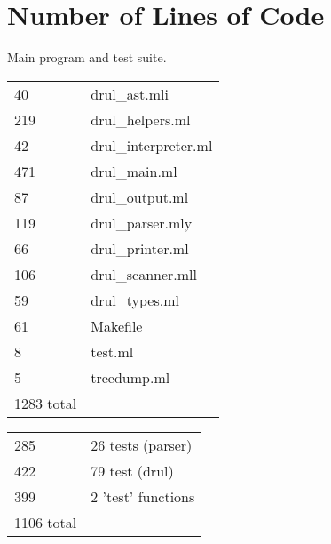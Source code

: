 


\chapter{Number of Lines of Code}

Main program and test suite.\\

\begin{table}[h]
\begin{small}
\begin{center}
\begin{tabular}{|l|l|} \hline
40	& drul\_ast.mli	\\
219	& drul\_helpers.ml\\	
42	& drul\_interpreter.ml\\
471	& drul\_main.ml\\
87	& drul\_output.ml	\\
119	& drul\_parser.mly\\ \hline
66	& drul\_printer.ml\\
106	& drul\_scanner.mll\\	
59	& drul\_types.ml\\
61	& Makefile\\
8	& test.ml	\\
5	& treedump.ml \\	\hline
 1283 total	& \\\hline
\end{tabular}
\end{center}
\end{small}
\end{table}


\begin{table}[h]
\begin{small}
\begin{center}
\begin{tabular}{|l|l|} \hline
285 & 26 tests (parser) \\
422 & 79 test (drul) \\
399 & 2 'test' functions \\ \hline
1106 total & \\ \hline
\end{tabular}
\end{center}
\end{small}
\end{table}
